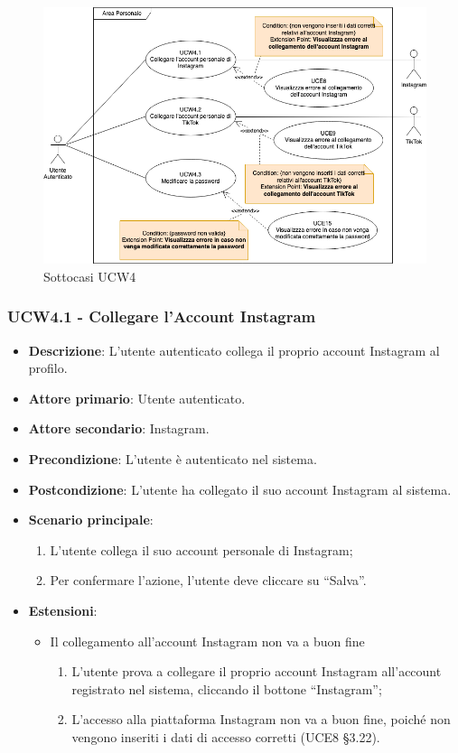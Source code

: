\begin{figure}[!h]
\centering
\includegraphics[scale=0.5]{UC_images/UCW4-1.png}
\caption{Sottocasi UCW4}
\end{figure}
\subsubsection{UCW4.1 - Collegare l'Account Instagram}
\begin{itemize}
\item \textbf{Descrizione}: L'utente autenticato collega il proprio account Instagram al profilo.
\item \textbf{Attore primario}: Utente autenticato.
\item \textbf{Attore secondario}: Instagram.
\item \textbf{Precondizione}: L’utente è autenticato nel sistema.
\item \textbf{Postcondizione}: L’utente ha collegato il suo account Instagram al sistema.

\item \textbf{Scenario principale}:
\begin{enumerate}
\item L’utente collega il suo account personale di Instagram;
\item Per confermare l’azione, l’utente deve cliccare su “Salva”. 
\end{enumerate}

\item \textbf{Estensioni}:
\begin{itemize}
\item Il collegamento all’account Instagram non va a buon fine
\begin{enumerate}
	\item L’utente prova a collegare il proprio account Instagram all’account registrato nel sistema, cliccando il bottone “Instagram”;
	\item L’accesso alla piattaforma Instagram non va a buon fine, poiché non vengono inseriti i dati di accesso corretti (UCE8 §3.22).
\end{enumerate}
\end{itemize}
\end{itemize}

